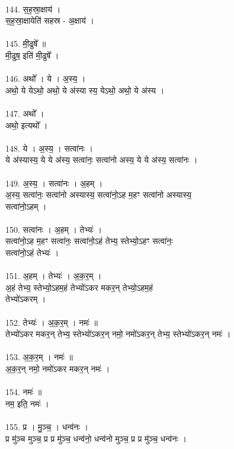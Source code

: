 \\
144. स॒ह॒स्रा॒क्षाय॑ ।\\
स॒ह॒स्रा॒क्षायेति॑ सहस्र - अ॒क्षाय॑ ।\\
\\
145. मी॒ढुषे᳚ ॥\\
मी॒ढुष॒ इति॑ मी॒ढुषे᳚ ।\\
\\
146. अथो᳚ । ये । अ॒स्य॒ ।\\
अथो॒ ये येऽथो॒ अथो॒ ये अ॑स्या स्य॒ येऽथो॒ अथो॒ ये अ॑स्य ।\\
\\
147. अथो᳚ ।\\
अथो॒ इत्यथो᳚ ।\\
\\
148. ये । अ॒स्य॒ । सत्वा॑नः ।\\
ये अ॑स्यास्य॒ ये ये अ॑स्य॒ सत्वा॑नः॒ सत्वा॑नो अस्य॒ ये ये अ॑स्य॒ सत्वा॑नः ।\\
\\
149. अ॒स्य॒ । सत्वा॑नः । अ॒हम् ।\\
अ॒स्य॒ सत्वा॑नः॒ सत्वा॑नो अस्यास्य॒ सत्वा॑नो॒ऽह म॒हꣳ सत्वा॑नो अस्यास्य॒\\
सत्वा॑नो॒ऽहम् ।\\
\\
150. सत्वा॑नः । अ॒हम् । तेभ्यः॑ ।\\
सत्वा॑नो॒ऽह म॒हꣳ सत्वा॑नः॒ सत्वा॑नो॒ऽहं तेभ्य॒ स्तेभ्यो॒ऽहꣳ सत्वा॑नः॒\\
सत्वा॑नो॒ऽहं तेभ्यः॑ ।\\
\\
151. अ॒हम् । तेभ्यः॑ । अ॒क॒र॒म् ।\\
अ॒हं तेभ्य॒ स्तेभ्यो॒ऽहम॒हं तेभ्यो॑ऽकर मकर॒न् तेभ्यो॒ऽहम॒हं\\
तेभ्यो॑ऽकरम् ।\\
\\
152. तेभ्यः॑ । अ॒क॒र॒म् । नमः॑ ॥\\
तेभ्यो॑ऽकर मकर॒न् तेभ्य॒ स्तेभ्यो॑ऽकर॒न् नमो॒ नमो॑ऽकर॒न् तेभ्य॒ स्तेभ्यो॑ऽकर॒न् नमः॑ ।\\
\\
153. अ॒क॒र॒म् । नमः॑ ॥\\
अ॒क॒र॒न् नमो॒ नमो॑ऽकर मकर॒न् नमः॑ ।\\
\\
154. नमः॑ ॥\\
नम॒ इति॒ नमः॑ ।\\
\\
155. प्र । मु॒ञ्च॒ । धन्व॑नः ।\\
प्र मु॑ञ्च मुञ्च॒ प्र प्र मु॑ञ्च॒ धन्व॑नो॒ धन्व॑नो मुञ्च॒ प्र प्र मु॑ञ्च॒ धन्व॑नः ।\\

